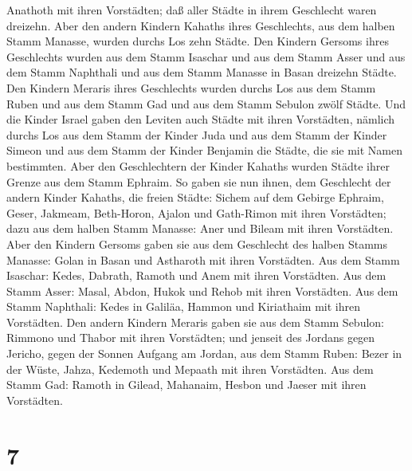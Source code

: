 Anathoth mit ihren Vorstädten; daß aller Städte in ihrem Geschlecht
waren dreizehn.  Aber den andern Kindern Kahaths ihres
Geschlechts, aus dem halben Stamm Manasse, wurden durchs Los zehn
Städte.  Den Kindern Gersoms ihres Geschlechts wurden aus
dem Stamm Isaschar und aus dem Stamm Asser und aus dem Stamm Naphthali
und aus dem Stamm Manasse in Basan dreizehn Städte.  Den
Kindern Meraris ihres Geschlechts wurden durchs Los aus dem Stamm Ruben
und aus dem Stamm Gad und aus dem Stamm Sebulon zwölf Städte.
 Und die Kinder Israel gaben den Leviten auch Städte mit
ihren Vorstädten,  nämlich durchs Los aus dem Stamm der
Kinder Juda und aus dem Stamm der Kinder Simeon und aus dem Stamm der
Kinder Benjamin die Städte, die sie mit Namen bestimmten. 
Aber den Geschlechtern der Kinder Kahaths wurden Städte ihrer Grenze aus
dem Stamm Ephraim.  So gaben sie nun ihnen, dem Geschlecht
der andern Kinder Kahaths, die freien Städte: Sichem auf dem Gebirge
Ephraim, Geser,  Jakmeam, Beth-Horon,  Ajalon
und Gath-Rimon mit ihren Vorstädten;  dazu aus dem halben
Stamm Manasse: Aner und Bileam mit ihren Vorstädten.  Aber
den Kindern Gersoms gaben sie aus dem Geschlecht des halben Stamms
Manasse: Golan in Basan und Astharoth mit ihren Vorstädten.
 Aus dem Stamm Isaschar: Kedes, Dabrath, 
Ramoth und Anem mit ihren Vorstädten.  Aus dem Stamm Asser:
Masal, Abdon,  Hukok und Rehob mit ihren Vorstädten.
 Aus dem Stamm Naphthali: Kedes in Galiläa, Hammon und
Kiriathaim mit ihren Vorstädten.  Den andern Kindern
Meraris gaben sie aus dem Stamm Sebulon: Rimmono und Thabor mit ihren
Vorstädten;  und jenseit des Jordans gegen Jericho, gegen
der Sonnen Aufgang am Jordan, aus dem Stamm Ruben: Bezer in der Wüste,
Jahza,  Kedemoth und Mepaath mit ihren Vorstädten.
 Aus dem Stamm Gad: Ramoth in Gilead, Mahanaim,
 Hesbon und Jaeser mit ihren Vorstädten.

\hypertarget{section-6}{%
\section{7}\label{section-6}}

